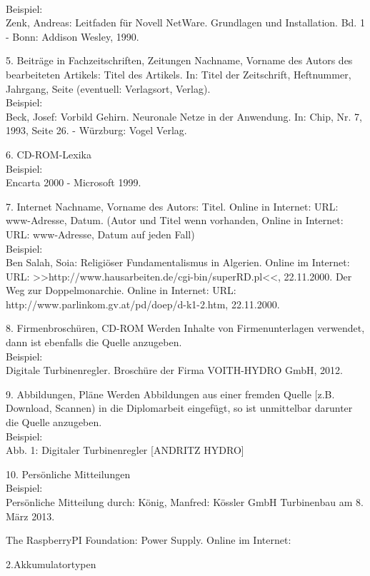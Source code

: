 \documentclass[12pt,a4paper]{article}
\begin{document}
{{{{\begin{description*}
		\\[1mm]Beispiel:
		\\Zenk, Andreas: Leitfaden für Novell NetWare. Grundlagen und Installation. Bd. 1 - Bonn:
		Addison Wesley, 1990.
		\vspace*{2mm}
	\item[5. Beiträge in Fachzeitschriften, Zeitungen] Nachname, Vorname des Autors des bearbeiteten
		Artikels: Titel des Artikels. In: Titel der Zeitschrift, Heftnummer, Jahrgang, Seite
		(eventuell: Verlagsort, Verlag).
		\\[1mm]Beispiel:
		\\Beck, Josef: Vorbild Gehirn. Neuronale Netze in der Anwendung. In: Chip, Nr. 7, 1993,
		Seite 26. - Würzburg: Vogel Verlag.
		\vspace*{2mm}
	\item[6. CD-ROM-Lexika]\hfill
		\\[1mm]Beispiel:
		\\Encarta 2000 - Microsoft 1999.
		\vspace*{2mm}
	\item[7. Internet] Nachname, Vorname des Autors: Titel. Online in Internet: URL: www-Adresse, Datum.
		(Autor und Titel wenn vorhanden, Online in Internet: URL: www-Adresse, Datum auf
		jeden Fall)
		\\[1mm]Beispiel:
		\\Ben Salah, Soia: Religiöser Fundamentalismus in Algerien. Online im Internet:
		URL: >>http:/\slash{}www.hausarbeiten.de\slash{}cgi-bin\slash{}superRD.pl<<,
		22.11.2000. Der Weg zur Doppelmonarchie.
		Online in Internet: URL:
		http:/\slash{}www.parlinkom.gv.at\slash{}pd\slash{}doep\slash{}d-k1-2.htm,
		22.11.2000.
		\vspace*{2mm}
	\item[8. Firmenbroschüren, CD-ROM] Werden Inhalte von Firmenunterlagen verwendet,
		dann ist ebenfalls die Quelle anzugeben.
		\\[1mm]Beispiel:
		\\Digitale Turbinenregler. Broschüre der Firma VOITH-HYDRO GmbH, 2012.
		\vspace*{2mm}
	\item[9. Abbildungen, Pläne] Werden Abbildungen aus einer fremden Quelle
		[z.B. Download, Scannen) in die Diplomarbeit eingefügt,
		so ist unmittelbar darunter die Quelle anzugeben.
		\\[1mm]Beispiel:
		\\Abb. 1: Digitaler Turbinenregler [ANDRITZ HYDRO]
		\vspace*{2mm}
	\item[10. Persönliche Mitteilungen]\hfill
		\\[1mm]Beispiel:
		\\Persönliche Mitteilung durch: König, Manfred:
		Kössler GmbH Turbinenbau am 8. März 2013.
	\item[]{The RaspberryPI Foundation: Power Supply. Online im Internet: }
	\item[2.Akkumulatortypen]{
 	}
	\end{description*}
	}}%
	}

}
\end{document}
